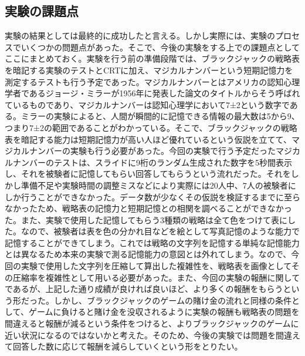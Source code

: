 \subsection{実験の課題点}
実験の結果としては最終的に成功したと言える。しかし実際には、実験のプロセスでいくつかの問題点があった。そこで、今後の実験をする上での課題点としてここにまとめておく。実験を行う前の準備段階では、ブラックジャックの戦略表を暗記する実験のテストとCRTに加え、マジカルナンバーという短期記憶力を測定するテストも行う予定であった。マジカルナンバーとはアメリカの認知心理学者であるジョージ・ミラーが1956年に発表した論文のタイトルからそう呼ばれているものであり、マジカルナンバーは認知心理学において7±2という数字である。ミラーの実験によると、人間が瞬間的に記憶できる情報の最大数は5から9、つまり7±2の範囲であることがわかっている。そこで、ブラックジャックの戦略表を暗記する能力は短期記憶力が高い人ほど優れているという仮説を立てて、マジカルナンバーの実験も行う必要があった。今回の実験で行う予定だったマジカルナンバーのテストは、スライドに9桁のランダム生成された数字を5秒間表示し、それを被験者に記憶してもらい回答してもらうという流れだった。それをしかし準備不足や実験時間の調整ミスなどにより実際には20人中、7人の被験者にしか行うことができなかった。データ数が少なくその仮説を検証するまでに至らなかったため、戦略表の記憶力と短期記憶との相関を調べることができなかった。また、実験で使用した記憶してもらう3種類の戦略は全て色をつけて表にした。なので、被験者は表を色の分かれ目などを絵として写真記憶のような能力で記憶することができてしまう。これでは戦略の文字列を記憶する単純な記憶能力とは異なるため本来の実験で測る記憶能力の意図とは外れてしまう。なので、今回の実験で使用した文字列を圧縮して算出した複雑性を、戦略表を画像としてその圧縮率を複雑性として用いる必要があった。また、今回の実験の報酬に関してであるが、上記した通り成績が良ければ良いほど、より多くの報酬をもらうという形だった。しかし、ブラックジャックのゲームの賭け金の流れと同様の条件として、ゲームに負けると賭け金を没収されるように実験の報酬も戦略表の問題を間違えると報酬が減るという条件をつけると、よりブラックジャックのゲームに近い状況になるのではないかと考えた。そのため、今後の実験では問題を間違えて回答した数に応じて報酬を減らしていくという形をとりたい。
